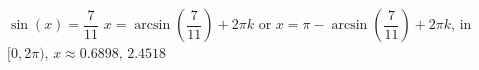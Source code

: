  {$\sin(x) = \dfrac{7}{11}$ }
{ $x = \arcsin\left(\dfrac{7}{11}\right) + 2\pi k$ or $x = \pi - \arcsin\left(\dfrac{7}{11}\right) + 2\pi k$, in  $[0, 2\pi)$, $x \approx 0.6898, \, 2.4518$}
